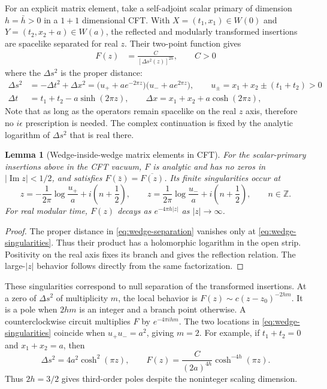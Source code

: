 \documentclass[a4paper,11pt]{article}
\newtheorem{lemma}[theorem]{Lemma}
\theoremstyle{definition}
\newcommand{\nn}{\nonumber}
\begin{document}
For an explicit matrix element, take a self-adjoint scalar primary of dimension $h=\bar{h}>0$ in a $1+1$ dimensional CFT. With $X=(t_1,x_1)\in W(0)$ and $Y=(t_2,x_2+a)\in W(a)$, the reflected and modularly transformed insertions are spacelike separated for real $z$. Their two-point function gives
\begin{align}
 F(z)&=\frac{C}{[\Delta s^2(z)]^{2h}},\qquad C>0
\label{eq:wedge-matrix-element}
\end{align}
where the $\Delta s^2$ is the proper distance:
\begin{align}
\Delta s^2&=-\Delta t^2+\Delta x^2
 =\bigl(u_++ae^{-2\pi z}\bigr)\bigl(u_-+ae^{2\pi z}\bigr),
 \qquad u_\pm=x_1+x_2\pm(t_1+t_2)>0\nn\\
 \Delta t&=t_1+t_2-a\sinh(2\pi z),\qquad
 \Delta x=x_1+x_2+a\cosh(2\pi z),
 \label{eq:wedge-separation}
\end{align}
Note that as long as the operators remain spacelike  on the real $z$ axis, therefore no $i\epsilon$ prescription is needed. The complex continuation is fixed by the analytic logarithm of $\Delta s^2$ that is real there.

\begin{lemma}[Wedge-inside-wedge matrix elements in CFT]
\label{lem:wedge-matrix-element}
For the scalar-primary insertions above in the CFT vacuum, $F$ is analytic and has no zeros in $|\operatorname{Im}z|<1/2$, and satisfies $F(\bar z)=\overline{F(z)}$. Its finite singularities occur at
\begin{equation}
 z=-\frac{1}{2\pi}\log\frac{u_+}{a}+i\left(n+\frac12\right),
 \qquad
 z=\frac{1}{2\pi}\log\frac{u_-}{a}+i\left(n+\frac12\right),
 \qquad n\in\mathbb Z.
 \label{eq:wedge-singularities}
\end{equation}
For real modular time, $F(z)$ decays as $e^{-4\pi h|z|}$ as $|z|\to\infty$.
\end{lemma}
\begin{proof}
The proper distance  in  \eqref{eq:wedge-separation} vanishes only at \eqref{eq:wedge-singularities}. Thus their product has a holomorphic logarithm in the open strip. Positivity on the real axis fixes its branch and gives the reflection relation. The large-$|z|$ behavior follows directly from the same factorization.
\end{proof}

These singularities correspond to null separation of the transformed insertions. At a zero of $\Delta s^2$ of multiplicity $m$, the local behavior is $F(z)\sim c(z-z_0)^{-2hm}$. It is a pole when $2hm$ is an integer and a branch point otherwise. A counterclockwise circuit multiplies $F$ by $e^{-4\pi ihm}$. The two locations in \eqref{eq:wedge-singularities} coincide when $u_+u_-=a^2$, giving $m=2$. For example, if $t_1+t_2=0$ and $x_1+x_2=a$, then
\[
 \Delta s^2=4a^2\cosh^2(\pi z),\qquad
 F(z)=\frac{C}{(2a)^{4h}}\cosh^{-4h}(\pi z).
\]
Thus $2h=3/2$ gives third-order poles despite the noninteger scaling dimension.
\end{document}
